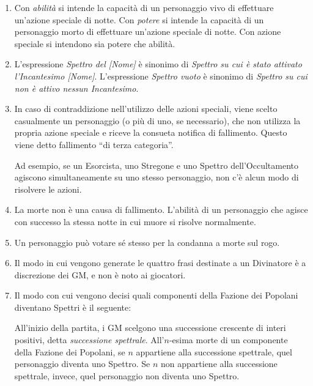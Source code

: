 \documentclass[a4paper,10pt]{article}
\begin{document}
\begin{enumerate}
	
	\item Con \emph{abilità} si intende la capacità di un personaggio vivo di effettuare un'azione speciale di notte. Con \emph{potere} si intende la capacità di un personaggio morto di effettuare un'azione speciale di notte. Con azione speciale si intendono sia potere che abilità.
	
	\item L'espressione \emph{Spettro del [Nome]} è sinonimo di \emph{Spettro su cui è stato attivato l'Incantesimo [Nome]}. L'espressione \emph{Spettro vuoto} è sinonimo di \emph{Spettro su cui non è attivo nessun Incantesimo}.
	
	\item In caso di contraddizione nell'utilizzo delle azioni speciali, viene scelto casualmente un personaggio (o più di uno, se necessario), che non utilizza la propria azione speciale e riceve la consueta notifica di fallimento. Questo viene detto fallimento ``di terza categoria''.
 
	Ad esempio, se un Esorcista, uno Stregone e uno Spettro dell'Occultamento agiscono simultaneamente su uno stesso personaggio, non c'è alcun modo di risolvere le azioni.
	
	\item La morte non è una causa di fallimento. L'abilità di un personaggio che agisce con successo la stessa notte in cui muore si risolve normalmente.
	
	\item Un personaggio può votare sé stesso per la condanna a morte sul rogo.
	
	\item Il modo in cui vengono generate le quattro frasi destinate a un Divinatore è a discrezione dei GM, e non è noto ai giocatori.
	
	\item Il modo con cui vengono decisi quali componenti della Fazione dei Popolani diventano Spettri è il seguente:
	
	All'inizio della partita, i GM scelgono una successione crescente di interi positivi, detta \emph{successione spettrale}. All'$n$-esima morte di un componente della Fazione dei Popolani, se $n$ appartiene alla successione spettrale, quel personaggio diventa uno Spettro. Se $n$ non appartiene alla successione spettrale, invece, quel personaggio non diventa uno Spettro.
	

\end{enumerate}
\end{document}
